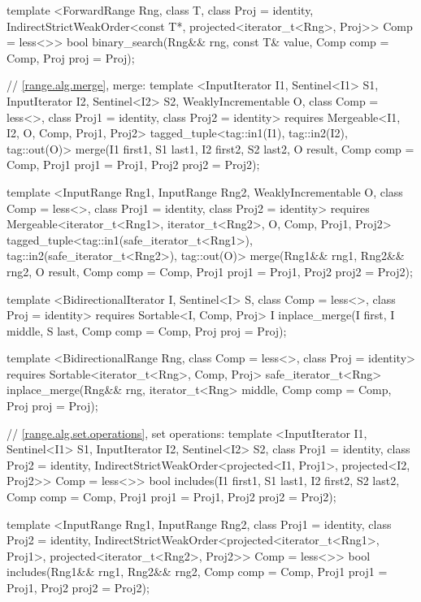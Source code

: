 {\begin{codeblock}
{{    template <ForwardRange Rng, class T, class Proj = identity,
        IndirectStrictWeakOrder<const T*, projected<iterator_t<Rng>, Proj>> Comp = less<>>
      bool binary_search(Rng&& rng, const T& value, Comp comp = Comp{},
                         Proj proj = Proj{});

    // \ref{range.alg.merge}, merge:
    template <InputIterator I1, Sentinel<I1> S1, InputIterator I2, Sentinel<I2> S2,
        WeaklyIncrementable O, class Comp = less<>, class Proj1 = identity,
        class Proj2 = identity>
      requires Mergeable<I1, I2, O, Comp, Proj1, Proj2>
      tagged_tuple<tag::in1(I1), tag::in2(I2), tag::out(O)>
        merge(I1 first1, S1 last1, I2 first2, S2 last2, O result,
              Comp comp = Comp{}, Proj1 proj1 = Proj1{}, Proj2 proj2 = Proj2{});

    template <InputRange Rng1, InputRange Rng2, WeaklyIncrementable O, class Comp = less<>,
        class Proj1 = identity, class Proj2 = identity>
      requires Mergeable<iterator_t<Rng1>, iterator_t<Rng2>, O, Comp, Proj1, Proj2>
      tagged_tuple<tag::in1(safe_iterator_t<Rng1>),
                   tag::in2(safe_iterator_t<Rng2>),
                   tag::out(O)>
        merge(Rng1&& rng1, Rng2&& rng2, O result,
              Comp comp = Comp{}, Proj1 proj1 = Proj1{}, Proj2 proj2 = Proj2{});

    template <BidirectionalIterator I, Sentinel<I> S, class Comp = less<>,
        class Proj = identity>
      requires Sortable<I, Comp, Proj>
      I inplace_merge(I first, I middle, S last, Comp comp = Comp{}, Proj proj = Proj{});

    template <BidirectionalRange Rng, class Comp = less<>, class Proj = identity>
      requires Sortable<iterator_t<Rng>, Comp, Proj>
      safe_iterator_t<Rng>
        inplace_merge(Rng&& rng, iterator_t<Rng> middle, Comp comp = Comp{},
                      Proj proj = Proj{});

    // \ref{range.alg.set.operations}, set operations:
    template <InputIterator I1, Sentinel<I1> S1, InputIterator I2, Sentinel<I2> S2,
        class Proj1 = identity, class Proj2 = identity,
        IndirectStrictWeakOrder<projected<I1, Proj1>, projected<I2, Proj2>> Comp = less<>>
      bool includes(I1 first1, S1 last1, I2 first2, S2 last2, Comp comp = Comp{},
                    Proj1 proj1 = Proj1{}, Proj2 proj2 = Proj2{});

    template <InputRange Rng1, InputRange Rng2, class Proj1 = identity,
        class Proj2 = identity,
        IndirectStrictWeakOrder<projected<iterator_t<Rng1>, Proj1>,
          projected<iterator_t<Rng2>, Proj2>> Comp = less<>>
      bool includes(Rng1&& rng1, Rng2&& rng2, Comp comp = Comp{},
                    Proj1 proj1 = Proj1{}, Proj2 proj2 = Proj2{});

}}
\end{codeblock}}
